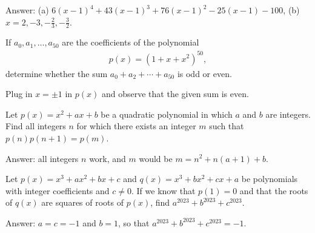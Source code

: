 \begin{solution}[name=Solution by Parviz Shahriari]
Answer: (a) $6(x-1)^4+43(x-1)^3+76(x-1)^2-25(x-1)-100$, (b) $x=2, -3, -\frac{2}{3}, -\frac{3}{2}$.
\end{solution}


\begin{tcolorbox}
\begin{question}
If $a_0,a_1,\dots,a_{50}$ are the coefficients of the polynomial
\begin{align*}
    p(x) = (1+x+x^2)^{50},
\end{align*}
determine whether the sum $a_0+a_2+\cdots+a_{50}$ is odd or even.
\end{question}
\end{tcolorbox}

\begin{solution}
Plug in $x=\pm 1$ in $p(x)$ and observe that the given sum is even.
\end{solution}




\begin{tcolorbox}
\begin{question}
Let $p(x)=x^2+ax+b$ be a quadratic polynomial in which $a$ and $b$ are integers. Find all integers $n$ for which there exists an integer $m$ such that $p(n)p(n+1)=p(m)$.
\end{question}
\end{tcolorbox}

\begin{solution}
Answer: all integers $n$ work, and $m$ would be $m=n^2 +n(a+1) +b$.
\end{solution}




\begin{tcolorbox}
\begin{question}
Let $p(x)=x^3+ax^2+bx+c$ and $q(x)=x^3+bx^2+cx+a$ be polynomials with integer coefficients and $c \neq 0$. If we know that $p(1)=0$ and that the roots of $q(x)$ are squares of roots of $p(x)$, find $a^{2023} + b^{2023} + c^{2023}$.
\end{question}
\end{tcolorbox}

\begin{solution}
Answer: $a=c=-1$ and $b=1$, so that $a^{2023} + b^{2023} + c^{2023}=-1$.
\end{solution}



